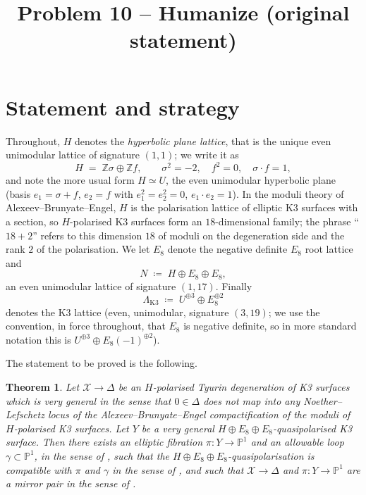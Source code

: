 \documentclass[11pt]{article}
\title{Problem 10 -- Humanize (original statement)}
\date{}
\newtheorem{theorem}{Theorem}[section]
\newcommand{\X}{\mathcal{X}}
\newcommand{\D}{\Delta}
\newcommand{\PP}{\mathbb{P}}
\newcommand{\bZ}{\mathbb{Z}}
\begin{document}
\maketitle

\section{Statement and strategy}

Throughout, $H$ denotes the \emph{hyperbolic plane lattice}, that is the
unique even unimodular lattice of signature $(1,1)$; we write it as
\[
H \;=\; \bZ\sigma \oplus \bZ f,\qquad
\sigma^2 = -2,\quad f^2=0,\quad \sigma\cdot f = 1,
\]
and note the more usual form $H\simeq U$, the even unimodular hyperbolic
plane (basis $e_1 = \sigma+f$, $e_2 = f$ with $e_1^2=e_2^2=0$,
$e_1\cdot e_2 = 1$). In the moduli theory of Alexeev--Brunyate--Engel, $H$
is the polarisation lattice of elliptic K3 surfaces with a section, so
$H$-polarised K3 surfaces form an $18$-dimensional family; the phrase
``$18+2$'' refers to this dimension $18$ of moduli on the degeneration side
and the rank $2$ of the polarisation. We let $E_8$ denote the negative
definite $E_8$ root lattice and
\[
N \;\coloneqq\; H \oplus E_8 \oplus E_8,
\]
an even unimodular lattice of signature $(1,17)$. Finally
\[
\Lambda_{\mathrm{K3}} \;\coloneqq\; U^{\oplus 3}\oplus E_8^{\oplus 2}
\]
denotes the K3 lattice (even, unimodular, signature $(3,19)$; we use the
convention, in force throughout, that $E_8$ is negative definite, so in
more standard notation this is
$U^{\oplus3}\oplus E_8(-1)^{\oplus2}$).

The statement to be proved is the following.

\begin{theorem}\label{thm:main}
Let $\X\to\D$ be an $H$-polarised Tyurin degeneration of K3 surfaces which is
very general in the sense that $0\in\D$ does not map into any
Noether--Lefschetz locus of the Alexeev--Brunyate--Engel compactification of
the moduli of $H$-polarised K3 surfaces. Let $Y$ be a very general $H\oplus
E_8\oplus E_8$-quasipolarised K3 surface. Then there exists an elliptic
fibration $\pi\colon Y\to\PP^1$ and an allowable loop
$\gamma\subset\PP^1$, in the sense of {\upshape[GT, Definition 4.11]}, such
that the $H\oplus E_8\oplus E_8$-quasipolarisation is compatible with $\pi$
and $\gamma$ in the sense of {\upshape[GT, Definition 4.21]}, and such that
$\X\to\D$ and $\pi\colon Y\to\PP^1$ are a mirror pair in the sense of
{\upshape[GT, Definition 5.1]}.
\end{theorem}
\end{document}
